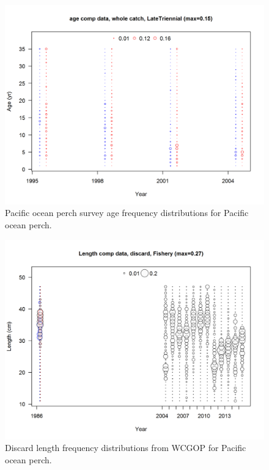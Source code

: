 \documentclass[12pt,]{article}
\begin{document}
\begin{figure}
\centering
\includegraphics{r4ss/plots_mod1/comp_agedat_bubflt4mkt0.png}
\caption{Pacific ocean perch survey age frequency distributions for
Pacific ocean perch. \label{fig:POP_Age}}
\end{figure}

\FloatBarrier

\begin{figure}
\centering
\includegraphics{r4ss/plots_mod1/comp_lendat_bubflt1mkt1.png}
\caption{Discard length frequency distributions from WCGOP for Pacific
ocean perch. \label{fig:WCGOP_discard}}
\end{figure}
\end{document}
